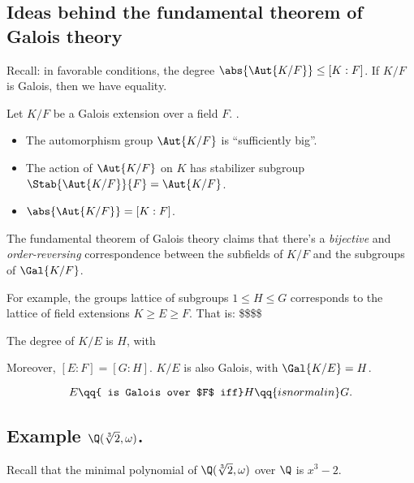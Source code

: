 \hypertarget{ideas-behind-the-fundamental-theorem-of-galois-theory}{%
\subsection{Ideas behind the fundamental theorem of Galois
theory}\label{ideas-behind-the-fundamental-theorem-of-galois-theory}}

Recall: in favorable conditions, the degree
\(\abs{\Aut{K/F}} \le [K: F]\). If \(K/F\) is Galois, then we have
equality.

Let \(K/F\) be a Galois extension over a field \(F\). \TFAE.

\begin{itemize}
\item
  The automorphism group \(\Aut{K/F}\) is ``sufficiently big''.
\item
  The action of \(\Aut{K/F}\) on \(K\) has stabilizer subgroup
  \(\Stab{\Aut{K/F}}{F} = \Aut{K/F}\).
\item
  \(\abs{\Aut{K/F}} = [K:F]\).
\end{itemize}

The fundamental theorem of Galois theory claims that there's a
\emph{bijective} and \emph{order-reversing} correspondence between the
subfields of \(K/F\) and the subgroups of \(\Gal{K/F}\).

For example, the groups lattice of subgroups \(1 \le H \le G\)
corresponds to the lattice of field extensions \(K \ge E \ge F\). That
is: \$\$\$\$ 

The degree of \(K/E\) is \(H\), with

Moreover, \([E:F] = [G:H]\). \(K/E\) is also Galois, with
\(\Gal{K/E} = H\).

\[E \qq{ is Galois over $F$ iff} H \qq{is normal in} G.\]

\hypertarget{example-qqsqrt32-omega.}{%
\subsection{\texorpdfstring{Example
\(\Q(\sqrt[3]{2}, \omega)\).}{Example \textbackslash Q(\textbackslash sqrt{[}3{]}\{2\}, \textbackslash omega).}}\label{example-qqsqrt32-omega.}}

Recall that the minimal polynomial of \(\Q(\sqrt[3]{2}, \omega)\) over
\(\Q\) is \(x^3 - 2\).

